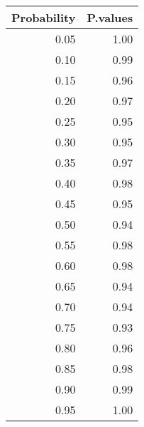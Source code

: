 \begin{table}[ht]
\centering
\begin{tabular}{rr}
  \hline
Probability & P.values \\ 
  \hline
0.05 & 1.00 \\ 
  0.10 & 0.99 \\ 
  0.15 & 0.96 \\ 
  0.20 & 0.97 \\ 
  0.25 & 0.95 \\ 
  0.30 & 0.95 \\ 
  0.35 & 0.97 \\ 
  0.40 & 0.98 \\ 
  0.45 & 0.95 \\ 
  0.50 & 0.94 \\ 
  0.55 & 0.98 \\ 
  0.60 & 0.98 \\ 
  0.65 & 0.94 \\ 
  0.70 & 0.94 \\ 
  0.75 & 0.93 \\ 
  0.80 & 0.96 \\ 
  0.85 & 0.98 \\ 
  0.90 & 0.99 \\ 
  0.95 & 1.00 \\ 
   \hline
\end{tabular}
\end{table}
